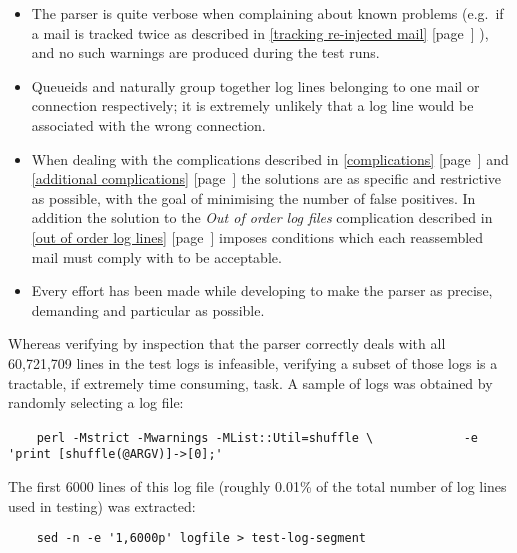 \documentclass[a4paper,12pt,draft]{article}
\newcommand{\refwithpage}[1]{%
    \empty{}\ref{#1} [page~\pageref{#1}]%
}
\newcommand{\sectionref}[1]{%
    \textsection{}\refwithpage{#1}%
}
\begin{document}
\begin{itemize}

    \item The parser is quite verbose when complaining about known problems
        (e.g.\ if a mail is tracked twice as described in
        \sectionref{tracking re-injected mail}), and no such warnings are
        produced during the test runs.

    \item Queueids and \pids{} naturally group together log lines belonging
        to one mail or connection respectively; it is extremely unlikely
        that a log line would be associated with the wrong connection.

    \item When dealing with the complications described in
        \sectionref{complications} and \sectionref{additional
        complications} the solutions are as specific and restrictive as
        possible, with the goal of minimising the number of false
        positives.  In addition the solution to the \textit{Out of order
        log files\/} complication described in \sectionref{out of order log
        lines} imposes conditions which each reassembled mail must comply
        with to be acceptable.

    \item Every effort has been made while developing to make the parser as
        precise, demanding and particular as possible.

\end{itemize}

Whereas verifying by inspection that the parser correctly deals with all
60,721,709 lines in the test logs is infeasible, verifying a subset of
those logs is a tractable, if extremely time consuming, task.  A sample of
logs was obtained by randomly selecting a log file:

\verb!    perl -Mstrict -Mwarnings -MList::Util=shuffle \!\newline
\verb!            -e 'print [shuffle(@ARGV)]->[0];'!

The first 6000 lines of this log file (roughly 0.01\% of the total number
of log lines used in testing) was extracted:

\verb!    sed -n -e '1,6000p' logfile > test-log-segment!
\end{document}
